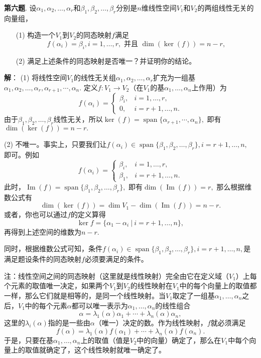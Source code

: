 \fi  %

\newpageorvspace

{\bf 第六题}. 设$\alpha_1, \alpha_2, \ldots, \alpha_r$和$\beta_1, \beta_2, \ldots, \beta_r$分别是$n$维线性空间$V_1$和$V_2$的两组线性无关的向量组，
\begin{itemize}
\item[(1)] 构造一个$V_1$到$V_2$的同态映射$f$满足
$$f(\alpha_i) = \beta_i, i = 1, \ldots, r, \text{ 并且 } \dim(\ker(f)) = n-r,$$
\item[(2)] 满足上述条件的同态映射是否唯一？并证明你的结论。
\end{itemize}

\ifIncludeAnswer

\newpageorvspace

{\bf 解}： (1) 将线性空间$V_1$的线性无关组$\alpha_1, \alpha_2, \ldots, \alpha_r$扩充为一组基$\alpha_1, \alpha_2, \ldots, \alpha_r, \alpha_{r+1}, \cdots, \alpha_n.$ 定义$f: V_1 \rightarrow V_2$（在$V_1$的基$\alpha_1, \ldots, \alpha_n$上作用）为
$$
f(\alpha_i) = \begin{cases}
\beta_i, & i = 1, \ldots, r, \\
0, & i = r+1, \ldots, n.
\end{cases}
$$
由于$\beta_1, \beta_2, \ldots, \beta_r$线性无关，所以$\ker(f) = \operatorname{span}\{ \alpha_{r+1}, \cdots, \alpha_n \},$ 即有$\dim(\ker(f)) = n-r.$

(2) 不唯一。事实上，只要我们让$f(\alpha_i) \in \operatorname{span} \{ \beta_1, \beta_2, \ldots, \beta_r \}, i = r+1, \ldots, n,$ 即可。例如
$$
f(\alpha_i) = \begin{cases}
\beta_i, & i = 1, \ldots, r, \\
\beta_1, & i = r+1, \ldots, n.
\end{cases}
$$
此时，$\operatorname{Im}(f) = \operatorname{span} \{ \beta_1, \beta_2, \ldots, \beta_r \},$ 即有$\dim(\operatorname{Im}(f)) = r,$ 那么根据维数公式有
$$\dim(\ker(f)) = \dim V_1 - \dim(\operatorname{Im}(f)) = n - r.$$
或者，你也可以通过$f$的定义算得
$$\ker f = \{ \alpha_1 - \alpha_i \ |\ i = r + 1, \ldots, n \},$$
再得到上述空间的维数为$n - r.$

同时，根据维数公式可知，条件$f(\alpha_i) \in \operatorname{span} \{ \beta_1, \beta_2, \ldots, \beta_r \}, i = r+1, \ldots, n,$是满足题设条件的同态映射$f$必须要满足的条件。

注：线性空间之间的同态映射（这里就是线性映射）完全由它在定义域（$V_1$）上每个元素的取值唯一决定，如果两个$V_1$到$V_2$的线性映射在$V_1$中的每个向量上的取值都一样，那么它们就是相等的，是同一个线性映射。当$V_1$取定了一组基$\alpha_1, \ldots, \alpha_n$之后，$V_1$中的每个元素$\alpha$都可以唯一表示为$\alpha_1, \ldots, \alpha_n$的线性组合
$$\alpha = \lambda_1(\alpha) \alpha_1 + \cdots + \lambda_n(\alpha) \alpha_n,$$
这里的$\lambda_i(\alpha)$指的是一些由$\alpha$（唯一）决定的数。作为线性映射，$f$就必须满足
$$f(\alpha) = \lambda_1(\alpha) f(\alpha_1) + \cdots + \lambda_n(\alpha) f(\alpha_n).$$
于是，只要在基$\alpha_1, \ldots, \alpha_n$上的取值（值是$V_2$中的向量）确定了，那么在$V_1$中每个向量上的取值就确定了，这个线性映射就唯一确定了。

\fi  %


